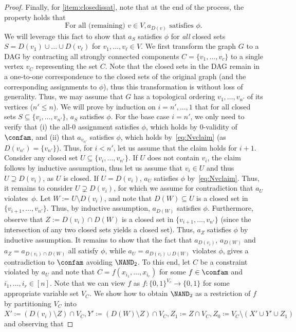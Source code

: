\begin{proof}
%
Finally, for \ref{item:closedissat}, note that at the end of the process, the property holds that
\begin{equation}\label{eq:Nvclaim}
\text{For all (remaining) } v\in V, a_{D(v)} \text{ satisfies } \phi.
\end{equation}
We will leverage this fact to show that $a_S$ satisfies $\phi$ for \emph{all} closed sets $S=D(v_1)\cup ... \cup D(v_\ell)$ for $v_1,\dots, v_\ell\in V$. We first transform the graph $G$ to a DAG by contracting all strongly connected components $C=\{v_1, \dots, v_c\}$ to a single vertex $v_C$ representing the set $C$. Note that the closed sets in the DAG remain in a one-to-one correspondence to the closed sets of the original graph (and the corresponding assignments to $\phi$), thus this transformation is without loss of generality. Thus, we may assume that $G$ has a topological ordering $v_1,\dots, v_{n'}$ of its vertices ($n'\le n$). We will prove by induction on $i=n', ..., 1$ that for all closed sets $S\subseteq \{v_i,...,v_{n'}\}$, $a_S$ satisfies $\phi$.
%
For the base case $i=n'$, we only need to verify that (i) the all-0 assignment satisfies $\phi$, which holds by 0-validity of $\confam$, and (ii) that $a_{v_{n'}}$ satisfies $\phi$, which holds by~\eqref{eq:Nvclaim} (as $D(v_{n'}) = \{v_{n'}\}$). Thus, for $i<n'$, let us assume that the claim holds for $i+1$. Consider any closed set $U\subseteq \{v_i, \dots, v_{n'}\}$. If $U$ does not contain $v_i$, the claim follows by inductive assumption, thus let us assume that $v_i \in U$ and thus $U\supseteq D(v_i)$, as $U$ is closed. If $U = D(v_i)$, $a_U$ satisfies $\phi$ by~\eqref{eq:Nvclaim}. Thus, it remains to consider $U \supsetneq D(v_i)$, for which we assume for contradiction that $a_U$ violates~$\phi$. Let $W := U\setminus D(v_i)$, and note that $D(W)\subseteq U$ is a closed set in $\{v_{i+1},\dots, v_{n'}\}$. Thus, by inductive assumption, $a_{D(W)}$ satisfies $\phi$. Furthermore, observe that $Z:=D(v_i)\cap D(W)$ is a closed set in $\{v_{i+1}, \dots, v_{n'}\}$ (since the intersection of any two closed sets yields a closed set). Thus, $a_Z$ satisfies $\phi$ by inductive assumption. It remains to show that the fact that $a_{D(v_i)}$, $a_{D(W)}$ and $a_Z=a_{D(v_i)\cap D(W)}$ all satisfy $\phi$, while $a_U=a_{D(v_i)\cup D(W)}$ violates $\phi$, gives a contradiction to $\confam$ avoiding $\NAND_2$.
%
To this end, let $C$ be a constraint violated by $a_U$ and note that $C=f(x_{i_1},\dots,x_{i_r})$ for some $f\in \confam$ and $i_1,\dots, i_r\in [n]$. Note that we can view $f$ as $f: \{0,1\}^{V_c} \to \{0,1\}$ for some appropriate variable set $V_C$. We show how to obtain $\NAND_2$ as a restriction of $f$ by partitioning $V_C$ into $X'\coloneqq (D(v_i) \setminus Z) \cap V_C, Y' \coloneqq (D(W)\setminus Z)\cap V_C, Z_1 \coloneqq Z\cap V_C, Z_0 \coloneqq V_C \setminus (X'\cup Y' \cup Z_1)$ and observing that 

\end{proof}
